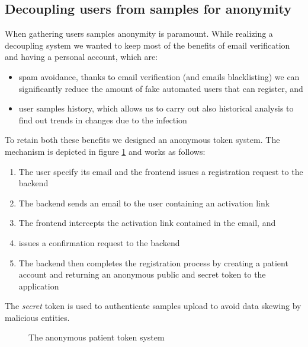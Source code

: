 \documentclass{article}[twocolumn]
\begin{document}
\subsection{Decoupling users from samples for anonymity}
When gathering users samples anonymity is paramount.
While realizing a decoupling system we wanted to keep most of the benefits of email verification and having a personal account, which are:
\begin{itemize}
  \item spam avoidance, thanks to email verification (and emails blacklisting) we can significantly reduce the amount of fake automated users that can register, and
  \item user samples history, which allows us to carry out also historical analysis to find out trends in changes due to the infection
\end{itemize}
To retain both these benefits we designed an anonymous token system.
The mechanism is depicted in figure \ref{fig:anon_token} and works as follows:
\begin{enumerate}
  \item The user specify its email and the frontend issues a registration request to the backend
  \item The backend sends an email to the user containing an activation link
  \item The frontend intercepts the activation link contained in the email, and
  \item issues a confirmation request to the backend
  \item The backend then completes the registration process by creating a patient account and returning an anonymous public and secret token to the application
\end{enumerate}
The \textit{secret} token is used to authenticate samples upload to avoid data skewing by malicious entities.
\begin{figure}[h]
  \centering
{}
\label{fig:anon_token}
\caption{The anonymous patient token system}
\end{figure}
\end{document}
